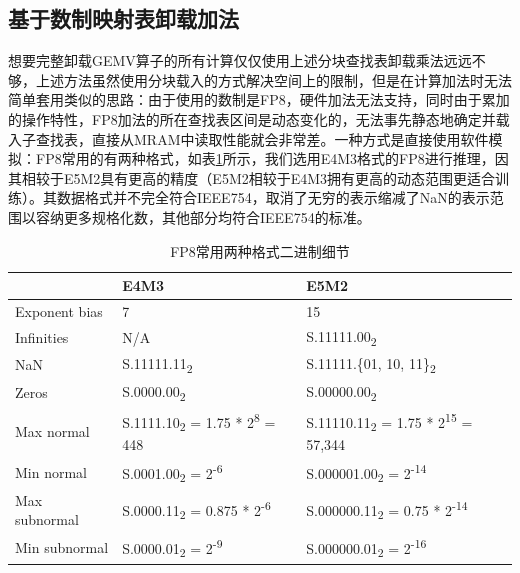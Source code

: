 \subsection{基于数制映射表卸载加法}
想要完整卸载GEMV算子的所有计算仅仅使用上述分块查找表卸载乘法远远不够，上述方法虽然使用分块载入的方式解决空间上的限制，但是在计算加法时无法简单套用类似的思路：由于使用的数制是FP8，硬件加法无法支持，同时由于累加的操作特性，FP8加法的所在查找表区间是动态变化的，无法事先静态地确定并载入子查找表，直接从MRAM中读取性能就会非常差。一种方式是直接使用软件模拟：FP8常用的有两种格式\cite{FP8}，如表\ref{FP8Format}所示，我们选用E4M3格式的FP8进行推理，因其相较于E5M2具有更高的精度（E5M2相较于E4M3拥有更高的动态范围更适合训练）。其数据格式并不完全符合IEEE754，取消了无穷的表示缩减了NaN的表示范围以容纳更多规格化数，其他部分均符合IEEE754的标准。
    
\begin{table}[!htbp]
    \caption{FP8常用两种格式二进制细节}
    \label{FP8Format}
    \begin{tabular}{lll}
        \toprule
        & E4M3 & E5M2 \\ 
        \midrule
        Exponent bias & 7 & 15 \\
        Infinities & N/A & S.11111.00\textsubscript{2} \\
        NaN & S.11111.11\textsubscript{2} & S.11111.\{01, 10, 11\}\textsubscript{2} \\
        Zeros & S.0000.00\textsubscript{2} & S.00000.00\textsubscript{2} \\
        Max normal & S.1111.10\textsubscript{2} = 1.75 * 2\textsuperscript{8} = 448 & S.11110.11\textsubscript{2} = 1.75 * 2\textsuperscript{15} = 57,344 \\
        Min normal & S.0001.00\textsubscript{2} = 2\textsuperscript{-6} & S.000001.00\textsubscript{2} = 2\textsuperscript{-14} \\
        Max subnormal & S.0000.11\textsubscript{2} = 0.875 * 2\textsuperscript{-6} & S.000000.11\textsubscript{2} = 0.75 * 2\textsuperscript{-14} \\
        Min subnormal & S.0000.01\textsubscript{2} = 2\textsuperscript{-9} & S.000000.01\textsubscript{2} = 2\textsuperscript{-16} \\ 
        \bottomrule
    \end{tabular}
\end{table}

